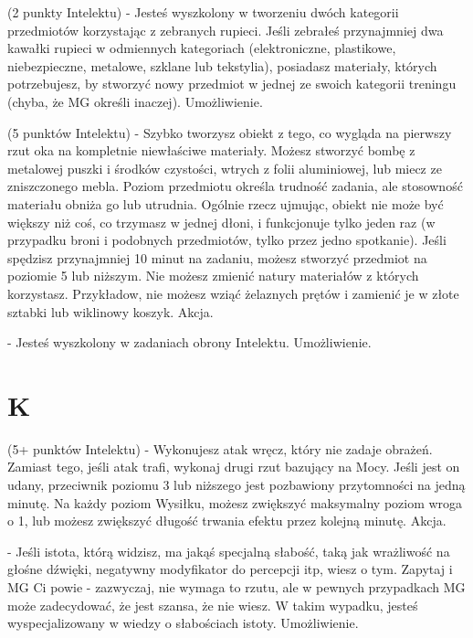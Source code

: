 { (2 punkty Intelektu) - Jesteś wyszkolony w tworzeniu dwóch kategorii przedmiotów korzystając z zebranych rupieci. Jeśli zebrałeś przynajmniej dwa kawałki rupieci w odmiennych kategoriach (elektroniczne, plastikowe, niebezpieczne, metalowe, szklane lub tekstylia), posiadasz materiały, których potrzebujesz, by stworzyć nowy przedmiot w jednej ze swoich kategorii treningu (chyba, że MG określi inaczej). Umożliwienie.

 (5 punktów Intelektu) - Szybko tworzysz obiekt z tego, co wygląda na pierwszy rzut oka na kompletnie niewłaściwe materiały. Możesz stworzyć bombę z metalowej puszki i środków czystości, wtrych z folii aluminiowej, lub miecz ze zniszczonego mebla. Poziom przedmiotu określa trudność zadania, ale stosowność materiału obniża go lub utrudnia. Ogólnie rzecz ujmując, obiekt nie może być większy niż coś, co trzymasz w jednej dłoni, i funkcjonuje tylko jeden raz (w przypadku broni i podobnych przedmiotów, tylko przez jedno spotkanie). Jeśli spędzisz przynajmniej 10 minut na zadaniu, możesz stworzyć przedmiot na poziomie 5 lub niższym. Nie możesz zmienić natury materiałów z których korzystasz. Przykładow, nie możesz wziąć żelaznych prętów i zamienić je w złote sztabki lub wiklinowy koszyk. Akcja.

 - Jesteś wyszkolony w zadaniach obrony Intelektu. Umożliwienie.

\section{K}

 (5+ punktów Intelektu) - Wykonujesz atak wręcz, który nie zadaje obrażeń. Zamiast tego, jeśli atak trafi, wykonaj drugi rzut bazujący na Mocy. Jeśli jest on udany, przeciwnik poziomu 3 lub niższego jest pozbawiony przytomności na jedną minutę. Na każdy poziom Wysiłku, możesz zwiększyć maksymalny poziom wroga o 1, lub możesz zwiększyć długość trwania efektu przez kolejną minutę. Akcja.

 - Jeśli istota, którą widzisz, ma jakąś specjalną słabość, taką jak wrażliwość na głośne dźwięki, negatywny modyfikator do percepcji itp, wiesz o tym. Zapytaj i MG Ci powie - zazwyczaj, nie wymaga to rzutu, ale w pewnych przypadkach MG może zadecydować, że jest szansa, że nie wiesz. W takim wypadku, jesteś wyspecjalizowany w wiedzy o słabościach istoty. Umożliwienie.

}
